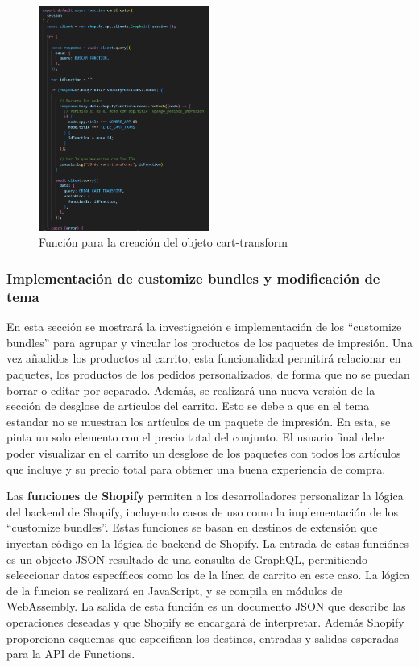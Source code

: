 \documentclass[12pt]{article}
\begin{document}
\begin{figure}[ht]
    \centering
    \includegraphics[width=0.5\textwidth]{imagenes-back/funcionCartCreator.png}
    \caption{\label{fig:funcioncartCreat} Función para la creación del objeto cart-transform}
    \vspace{\fill}
\end{figure}


\clearpage
\subsubsection{Implementación de customize bundles y modificación de tema}
En esta sección se mostrará la investigación e implementación de los ``customize bundles'' para agrupar y vincular los
productos de los paquetes de impresión. Una vez añadidos los productos al carrito, esta funcionalidad permitirá relacionar en paquetes, los productos de los pedidos personalizados, de forma que no se puedan borrar
o editar por separado. Además, se realizará una nueva versión de la sección de desglose de artículos del carrito. Esto se debe a que en el tema estandar no se muestran los artículos de un paquete 
de impresión. En esta, se pinta un solo elemento con el precio total del conjunto. El usuario final debe poder visualizar en el carrito un desglose de los paquetes con todos los artículos que incluye y su precio 
total para obtener una buena experiencia de compra.

Las \textbf{funciones de Shopify} \cite{shopify-functions} permiten a los desarrolladores personalizar la lógica del backend de Shopify, incluyendo casos de uso como la implementación de los
``customize bundles''. Estas funciones se basan en destinos de extensión que inyectan código en la lógica de backend de Shopify. La entrada de estas funciónes es un objecto JSON resultado de una
consulta de GraphQL, permitiendo seleccionar datos específicos como los de la línea de carrito en este caso. La lógica de la funcion se realizará en JavaScript, y se compila en módulos de WebAssembly.
La salida de esta función es un documento JSON que describe las operaciones deseadas y que Shopify se encargará de interpretar. Además Shopify proporciona esquemas que especifican los 
destinos, entradas y salidas esperadas para la API de Functions.
\end{document}
